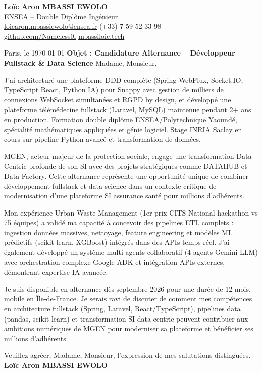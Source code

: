 \documentclass[a4paper,11pt]{article}
\begin{document}
\noindent \textbf{Lo\"ic Aron MBASSI EWOLO} \\
ENSEA -- Double Dipl\^ome Ing\'enieur \\
\href{mailto:loicaron.mbassiewolo@ensea.fr}{loicaron.mbassiewolo@ensea.fr} \quad (+33) 7 59 52 33 98 \\
\href{https://github.com/Nameless0l}{github.com/Nameless0l} \quad \href{https://mbassiloic.tech}{mbassiloic.tech}

\vspace{1em}\noindent Paris, le \today
\vspace{1em}\noindent \textbf{Objet : Candidature Alternance -- D\'eveloppeur Fullstack \& Data Science}
\vspace{1.5em}\noindent Madame, Monsieur,

\vspace{0.8em}\noindent J'ai architecturé une plateforme DDD complète (Spring WebFlux, Socket.IO, TypeScript React, Python IA) pour Snappy avec gestion de milliers de connexions WebSocket simultanées et RGPD by design, et développé une plateforme télémédecine fullstack (Laravel, MySQL) maintenue pendant 2+ ans en production. Formation double diplôme ENSEA/Polytechnique Yaoundé, spécialité mathématiques appliquées et génie logiciel. Stage INRIA Saclay en cours sur pipeline Python avancé et transformation de données.

\vspace{0.8em}\noindent MGEN, acteur majeur de la protection sociale, engage une transformation Data Centric profonde de son SI avec des projets stratégiques comme DATAHUB et Data Factory. Cette alternance représente une opportunité unique de combiner développement fullstack et data science dans un contexte critique de modernisation d'une plateforme SI assurance santé pour millions d'adhérents.

\vspace{0.8em}\noindent Mon expérience Urban Waste Management (1er prix CITS National hackathon vs 75 équipes) a validé ma capacité à concevoir des pipelines ETL complets : ingestion données massives, nettoyage, feature engineering et modèles ML prédictifs (scikit-learn, XGBoost) intégrés dans des APIs temps réel. J'ai également développé un système multi-agents collaboratif (4 agents Gemini LLM) avec orchestration complexe Google ADK et intégration APIs externes, démontrant expertise IA avancée.

\vspace{0.8em}\noindent Je suis disponible en alternance dès septembre 2026 pour une durée de 12 mois, mobile en Île-de-France. Je serais ravi de discuter de comment mes compétences en architecture fullstack (Spring, Laravel, React/TypeScript), pipelines data (pandas, scikit-learn) et transformation SI data-centric peuvent contribuer aux ambitions numériques de MGEN pour moderniser sa plateforme et bénéficier ses millions d'adhérents.

\vspace{1.5em}\noindent Veuillez agr\'eer, Madame, Monsieur, l'expression de mes salutations distingu\'ees.
\vspace{2em}\noindent \textbf{Lo\"ic Aron MBASSI EWOLO}
\end{document}
